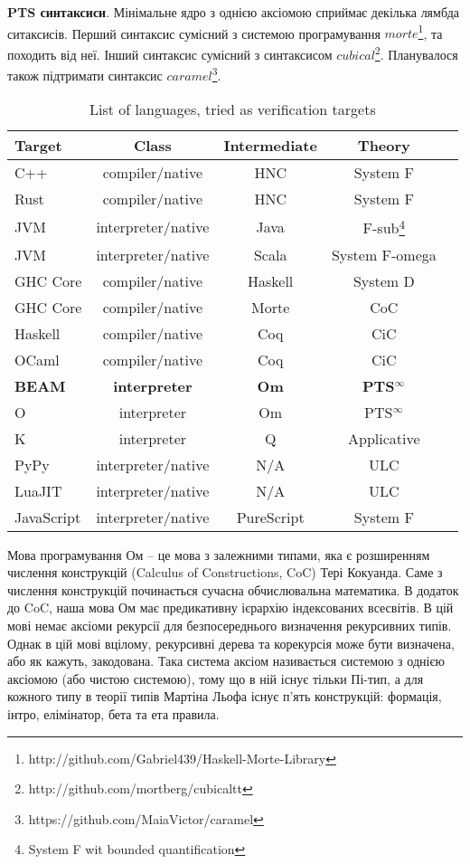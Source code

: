 {\bf PTS синтаксиси}. Мінімальне ядро з однією аксіомою
сприймає декілька лямбда ситаксисів.
Перший синтаксис сумісний з системою програмування
$morte$\footnote{http://github.com/Gabriel439/Haskell-Morte-Library}, та походить від неї.
Інший синтаксис сумісний з синтаксисом $cubical$\footnote{http://github.com/mortberg/cubicaltt}.
Планувалося також підтримати синтаксис $caramel$\footnote{https://github.com/MaiaVictor/caramel}.

\begin{table}[h]
\begin{center}
\caption{List of languages, tried as verification targets}
\label{tab:a}
\begin{tabular}{lcccc}
\hline
{\bf Target} & {\bf Class} & {\bf Intermediate} & {\bf Theory}\\
\hline
C++        & compiler/native      & HNC & System F\\
Rust       & compiler/native      & HNC & System F\\
JVM        & interpreter/native   & Java    & F-sub\footnote{System F wit bounded quantification}\\
JVM        & interpreter/native   & Scala   & System F-omega\\
GHC Core   & compiler/native      & Haskell & System D\\
GHC Core   & compiler/native      & Morte   & CoC\\
Haskell    & compiler/native      & Coq     & CiC\\
OCaml      & compiler/native      & Coq     & CiC\\
{\bf BEAM} & {\bf interpreter} & {\bf Om}   & {\bf PTS$^\infty$} \\
O          & interpreter          & Om  & PTS$^\infty$ \\
K          & interpreter          & Q   & Applicative \\
PyPy       & interpreter/native   & N/A & ULC \\
LuaJIT     & interpreter/native   & N/A & ULC \\
JavaScript & interpreter/native & PureScript & System F\\
\hline
\end{tabular}
\end{center}
\end{table}

Мова програмування Ом -- це мова з залежними типами, яка є розширенням
числення конструкцій (Calculus of Constructions, CoC) Тері Кокуанда. Саме з числення
конструкцій починається сучасна обчислювальна математика. В додаток до CoC,
наша мова Ом має предикативну ієрархію індексованих всесвітів. В цій мові немає
аксіоми рекурсії для безпосереднього визначення рекурсивних типів. Однак в цій мові
вцілому, рекурсивні дерева та корекурсія може бути визначена, або як кажуть, закодована.
Така система аксіом називається системою з однією аксіомою (або чистою системою), тому що в ній
існує тільки Пі-тип, а для кожного типу в теорії типів Мартіна Льофа існує п'ять
конструкцій: формація, інтро, елімінатор, бета та ета правила.

